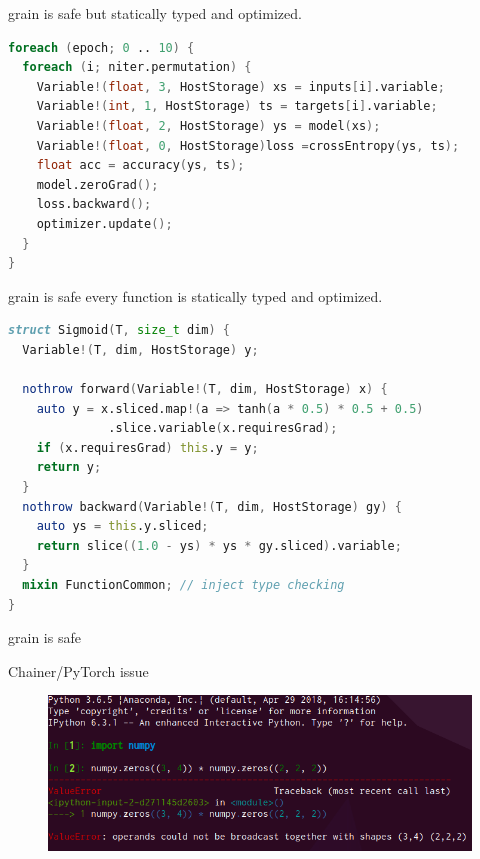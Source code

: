 \documentclass[aspectratio=169,
  14pt,xcolor=dvipsnames,table,professional font,dvipdfmx]{beamer}
\begin{document}
\begin{frame}[fragile]{grain is \alert{safe}}
but statically typed and optimized.
  \begin{lstlisting}[language=D,basicstyle=\footnotesize\ttfamily]
foreach (epoch; 0 .. 10) {
  foreach (i; niter.permutation) {
    Variable!(float, 3, HostStorage) xs = inputs[i].variable;
    Variable!(int, 1, HostStorage) ts = targets[i].variable;
    Variable!(float, 2, HostStorage) ys = model(xs);
    Variable!(float, 0, HostStorage)loss =crossEntropy(ys, ts);
    float acc = accuracy(ys, ts);
    model.zeroGrad();
    loss.backward();
    optimizer.update();
  }
}\end{lstlisting}
\end{frame}

\begin{frame}[fragile]{grain is \alert{safe}}
  every function is statically typed and optimized.
  \begin{lstlisting}[language=D,basicstyle=\footnotesize\ttfamily]
struct Sigmoid(T, size_t dim) {
  Variable!(T, dim, HostStorage) y;

  nothrow forward(Variable!(T, dim, HostStorage) x) {
    auto y = x.sliced.map!(a => tanh(a * 0.5) * 0.5 + 0.5)
              .slice.variable(x.requiresGrad);
    if (x.requiresGrad) this.y = y;
    return y;
  }
  nothrow backward(Variable!(T, dim, HostStorage) gy) {
    auto ys = this.y.sliced;
    return slice((1.0 - ys) * ys * gy.sliced).variable;
  }
  mixin FunctionCommon; // inject type checking
}\end{lstlisting}
\end{frame}

\begin{frame}{grain is \alert{safe}}
  \begin{alertblock}{Chainer/PyTorch issue}
  \begin{figure}[b]
	\centering
	\includegraphics[height=0.6\textheight]{./fig/ipython.png}
  \end{figure}
  \end{alertblock}
\end{frame}
\end{document}
